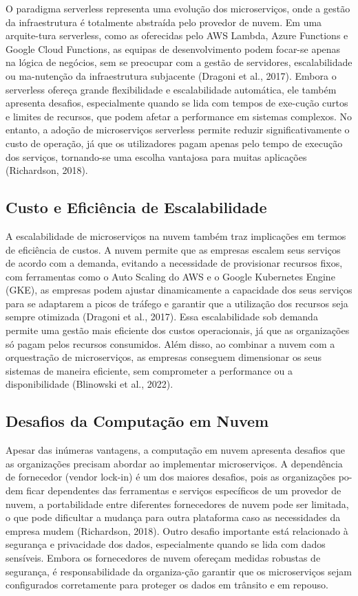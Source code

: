 O paradigma serverless representa uma evolução dos microserviços, onde a gestão da infraestrutura é totalmente abstraída pelo provedor de nuvem. Em uma arquite-tura serverless, como as oferecidas pelo AWS Lambda, Azure Functions e Google Cloud Functions, as equipas de desenvolvimento podem focar-se apenas na lógica de negócios, sem se preocupar com a gestão de servidores, escalabilidade ou ma-nutenção da infraestrutura subjacente (Dragoni et al., 2017).
Embora o serverless ofereça grande flexibilidade e escalabilidade automática, ele também apresenta desafios, especialmente quando se lida com tempos de exe-cução curtos e limites de recursos, que podem afetar a performance em sistemas complexos. No entanto, a adoção de microserviços serverless permite reduzir significativamente o custo de operação, já que os utilizadores pagam apenas pelo tempo de execução dos serviços, tornando-se uma escolha vantajosa para muitas aplicações (Richardson, 2018).

\subsection{Custo e Eficiência de Escalabilidade}

A escalabilidade de microserviços na nuvem também traz implicações em termos de eficiência de custos. A nuvem permite que as empresas escalem seus serviços de acordo com a demanda, evitando a necessidade de provisionar recursos fixos, com ferramentas como o Auto Scaling do AWS e o Google Kubernetes Engine (GKE), as empresas podem ajustar dinamicamente a capacidade dos seus serviços para se adaptarem a picos de tráfego e garantir que a utilização dos recursos seja sempre otimizada (Dragoni et al., 2017).
Essa escalabilidade sob demanda permite uma gestão mais eficiente dos custos operacionais, já que as organizações só pagam pelos recursos consumidos. Além disso, ao combinar a nuvem com a orquestração de microserviços, as empresas conseguem dimensionar os seus sistemas de maneira eficiente, sem comprometer a performance ou a disponibilidade (Blinowski et al., 2022).

\subsection{Desafios da Computação em Nuvem}

Apesar das inúmeras vantagens, a computação em nuvem apresenta desafios que as organizações precisam abordar ao implementar microserviços. A dependência de fornecedor (vendor lock-in) é um dos maiores desafios, pois as organizações po-dem ficar dependentes das ferramentas e serviços específicos de um provedor de nuvem, a portabilidade entre diferentes fornecedores de nuvem pode ser limitada, o que pode dificultar a mudança para outra plataforma caso as necessidades da empresa mudem (Richardson, 2018).
Outro desafio importante está relacionado à segurança e privacidade dos dados, especialmente quando se lida com dados sensíveis. Embora os fornecedores de nuvem ofereçam medidas robustas de segurança, é responsabilidade da organiza-ção garantir que os microserviços sejam configurados corretamente para proteger os dados em trânsito e em repouso.

